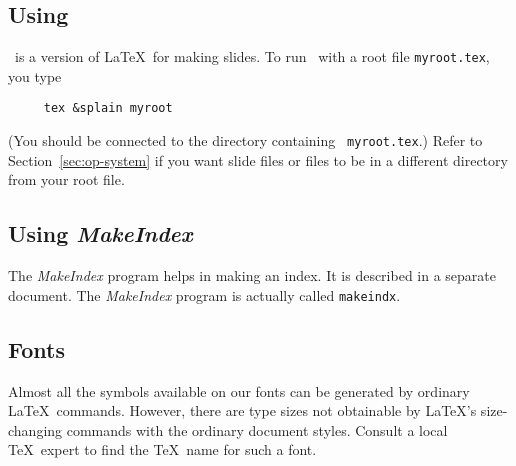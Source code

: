  
\subsection{Using \SLiTeX}
 
\SLiTeX\ is a version of \LaTeX\ for making slides.
To run \SLiTeX\  with a root file \mbox{\tt myroot.tex}, you type
\begin{verbatim}
     tex &splain myroot
\end{verbatim}
(You should be connected to the directory containing \mbox{\tt
myroot.tex}.) Refer to Section~\ref{sec:op-system} if you want slide
files or \hbox{\verb||} files to be in a different directory from
your root file.
  
\subsection{Using {\em MakeIndex\/}} \label{sec:makeindex}
 
The {\em MakeIndex\/} program helps in making an index.  It is 
described in a separate document.
The {\em MakeIndex} program is actually called {\tt makeindx}.

 
\subsection{Fonts}
 
Almost all the symbols available on our fonts can be generated by
ordinary \LaTeX\ commands.  However, there are type sizes not
obtainable by \LaTeX's size-changing commands with the ordinary
document styles.  Consult a local \TeX\ expert to find the
\TeX\ name for such a font.
 
